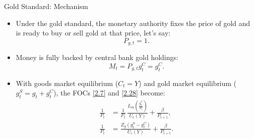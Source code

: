 \documentclass[11pt,aspectratio=169]{beamer}
\begin{document}
\begin{frame}{Gold Standard: Mechanism}
\small
\begin{itemize}

    \item Under the gold standard, the monetary authority fixes the price of gold and is ready to buy or sell gold at that price, let's say:
    \[
        P_{g,t} = 1.
    \]

    \vspace{0.3em}

    \item Money is fully backed by central bank gold holdings:
    \[
        M_t = P_{g,t} g_t^C = g_t^C.
    \]

    \vspace{0.3em}

    \item With goods market equilibrium ($C_t = Y$) and gold market equilibrium ($g_t^S = g_t + g_t^C$),  
    the FOCs \eqref{2.7} and \eqref{2.28} become:
    \begin{align}
        \frac{1}{P_t} 
        &= \frac{1}{P_t}\,
           \frac{L_m\!\left(\tfrac{g_t^C}{P_t}\right)}{U_c(Y)}
           + \frac{\beta}{P_{t+1}},
        \\[1em]
        \frac{1}{P_t} 
        &= \frac{Z_g(g_t^S - g_t^C)}{U_c(Y)} 
           + \frac{\beta}{P_{t+1}}.
        \tag{2.29}\label{2.29}
    \end{align}

\end{itemize}
\end{frame}
\end{document}
